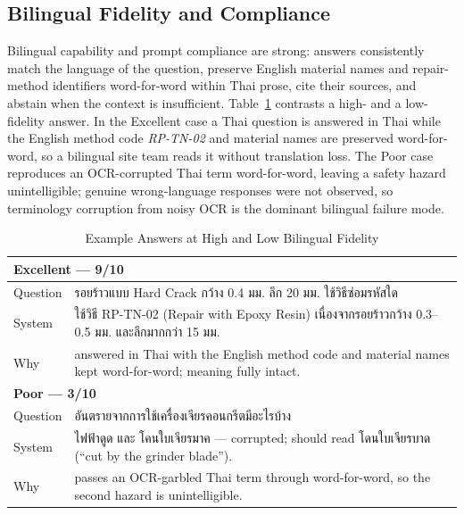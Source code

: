 \documentclass[10pt,a4paper,conference]{IEEEtran}
\newcommand{\thai}[1]{#1}
\newcommand{\thai}[1]{{\thaifont #1}}
\begin{document}
\subsection{Bilingual Fidelity and Compliance}
Bilingual capability and prompt compliance are strong: answers consistently
match the language of the question, preserve English material names and
repair-method identifiers word-for-word within Thai prose, cite their sources, and
abstain when the context is insufficient. Table~\ref{tab:exbil} contrasts a
high- and a low-fidelity answer. In the Excellent case a Thai question is
answered in Thai while the English method code \emph{RP-TN-02} and material names
are preserved word-for-word, so a bilingual site team reads it without translation
loss. The Poor case reproduces an OCR-corrupted Thai term word-for-word, leaving a
safety hazard unintelligible; genuine wrong-language responses were not observed,
so terminology corruption from noisy OCR is the dominant bilingual failure mode.

\begin{table}[htbp]
\caption{Example Answers at High and Low Bilingual Fidelity}
\begin{center}
\footnotesize
\begin{tabular}{|p{}|p{}|}
\hline
\multicolumn{2}{|l|}{\textbf{Excellent --- 9/10}} \\
\hline
Question & \thai{รอยร้าวแบบ Hard Crack กว้าง 0.4 มม. ลึก 20 มม. ใช้วิธีซ่อมรหัสใด} \\
\hline
System & \thai{ใช้วิธี RP-TN-02 (Repair with Epoxy Resin) เนื่องจากรอยร้าวกว้าง 0.3--0.5 มม. และลึกมากกว่า 15 มม.} \\
\hline
Why & answered in Thai with the English method code and material names kept word-for-word; meaning fully intact. \\
\hline
\multicolumn{2}{|l|}{\textbf{Poor --- 3/10}} \\
\hline
Question & \thai{อันตรายจากการใช้เครื่องเจียรคอนกรีตมีอะไรบ้าง} \\
\hline
System & \thai{ไฟฟ้าดูด และ โคนใบเจียรมาค} --- corrupted; should read \thai{โดนใบเจียรบาด} (``cut by the grinder blade''). \\
\hline
Why & passes an OCR-garbled Thai term through word-for-word, so the second hazard is unintelligible. \\
\hline
\end{tabular}
\label{tab:exbil}
\end{center}
\end{table}
\end{document}

